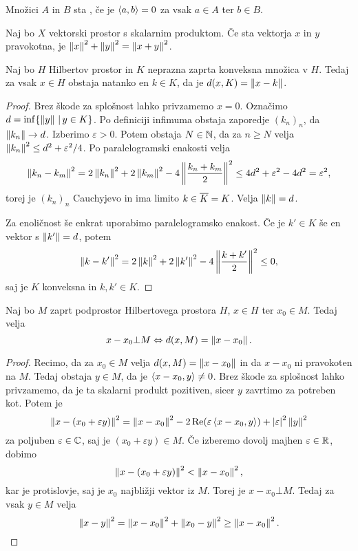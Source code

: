 \begin{definicija}
  Množici $A$ in $B$ sta , če je $\left< a,b \right> = 0$ za vsak $a \in
  A$ ter $b \in B$.
\end{definicija}

\begin{izrek}[Pitagora]
  Naj bo $X$ vektorski prostor s skalarnim produktom.
  Če sta vektorja $x$ in $y$ pravokotna, je $\left\lVert x\right\rVert^2 + \left\lVert y\right\rVert^2 =
  \left\lVert x+y\right\rVert^2$.
\end{izrek}

\begin{izrek}
  Naj bo $H$ Hilbertov prostor in $K$ neprazna zaprta konveksna množica v $H$.
  Tedaj za vsak $x \in H$ obstaja natanko en $k \in K$, da je $d(x,K) =
  \left\lVert x-k\right\rVert$.
\end{izrek}

\begin{proof}
  Brez škode za splošnost lahko privzamemo $x = 0$.
  Označimo $d = \inf \{\left\lVert y\right\rVert \,|\, y \in K\}$.
  Po definiciji infimuma obstaja zaporedje $(k_n)_n$, da $\left\lVert k_n\right\rVert \to d$.
  Izberimo $\varepsilon > 0$.
  Potem obstaja $N \in \mathbb{N}$, da za $n \ge N$ velja $\left\lVert k_n\right\rVert^2 \le d^2 +
  \varepsilon^2 /4$.
  Po paralelogramski enakosti velja
  \[
	\left\lVert k_n - k_m\right\rVert^2 = 2 \left\lVert k_n\right\rVert^2 + 2 \left\lVert k_m\right\rVert^2 - 4 \left\lVert\frac{k_n +
		k_m}{2}\right\rVert^2
	\le 4 d^2 + \varepsilon^2 - 4 d^2 = \varepsilon^2,
  \]
  torej je $(k_n)_n$ Cauchyjevo in ima limito $k \in \overline{K} = K$.
  Velja $\left\lVert k\right\rVert = d$.

  Za enoličnost še enkrat uporabimo paralelogramsko enakost.
  Če je $k' \in K$ še en vektor s $\left\lVert k'\right\rVert = d$, potem
  \[
	\left\lVert k-k'\right\rVert^2 = 2 \left\lVert k\right\rVert^2 + 2 \left\lVert k'\right\rVert^2 - 4 \left\lVert\frac{k+k'}{2}\right\rVert^2 \le 0,
  \]
  saj je $K$ konveksna in $k, k' \in K$.
\end{proof}


\begin{izrek}
  Naj bo $M$ zaprt podprostor Hilbertovega prostora $H$, $x \in H$ ter $x_0 \in
  M$.
  Tedaj velja
  \[
	x - x_0 \bot M \Leftrightarrow d(x,M) = \left\lVert x-x_0\right\rVert.
  \]
\end{izrek}

\begin{proof}
  Recimo, da za $x_0 \in M$ velja $d(x,M) = \left\lVert x-x_0\right\rVert$ in da $x - x_0$ ni
  pravokoten na $M$.
  Tedaj obstaja $y \in M$, da je $\left< x - x_0, y \right> \ne 0$.
  Brez škode za splošnost lahko privzamemo, da je ta skalarni produkt pozitiven,
  sicer $y$ zavrtimo za potreben kot.
  Potem je
  \[
	\left\lVert x - (x_0 + \varepsilon y)\right\rVert^2 = \left\lVert x - x_0\right\rVert^2 -
	2 \operatorname{Re} (\varepsilon \left< x - x_0, y \right>) + \left| \varepsilon \right|^2 \left\lVert y\right\rVert^2
  \]
  za poljuben $\varepsilon \in \mathbb{C}$, saj je $(x_0 + \varepsilon y) \in M$.
  Če izberemo dovolj majhen $\varepsilon \in \mathbb{R}$, dobimo
  \[
	\left\lVert x - (x_0 + \varepsilon y)\right\rVert^2 < \left\lVert x - x_0\right\rVert^2,
  \]
  kar je protislovje, saj je $x_0$ najbližji vektor iz $M$.
  Torej je $x - x_0 \bot M$.
  Tedaj za vsak $y \in M$ velja
  \[
	\left\lVert x-y\right\rVert^2 = \left\lVert x-x_0\right\rVert^2 + \left\lVert x_0 - y\right\rVert^2 \ge \left\lVert x - x_0\right\rVert^2.
	\qedhere
  \]
\end{proof}


